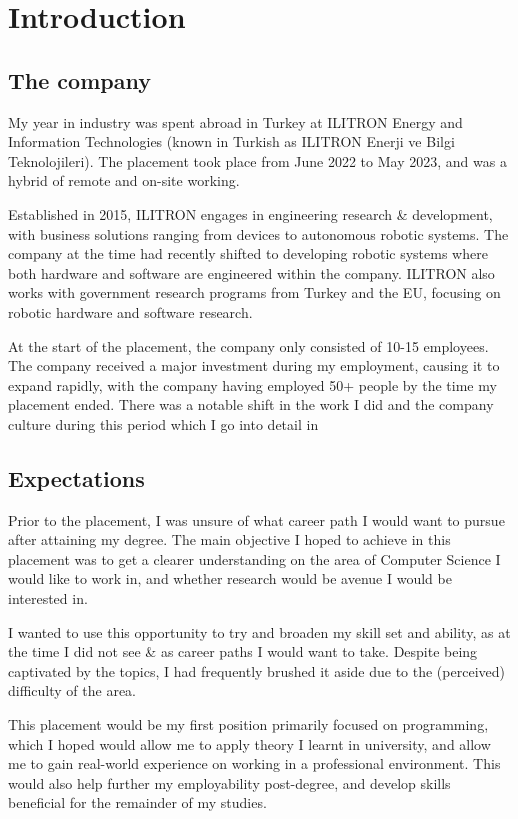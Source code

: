 \chapter{Introduction}

\section{The company}

My year in industry was spent abroad in Turkey at ILITRON Energy and Information Technologies (known
in Turkish as ILITRON Enerji ve Bilgi Teknolojileri). The placement took place from June 2022 to May
2023, and was a hybrid of remote and on-site working.

Established in 2015, ILITRON engages in engineering research \& development, with business solutions
ranging from  devices to autonomous robotic systems. The company at the time had recently
shifted to developing robotic systems where both hardware and software are engineered within the
company. ILITRON also works with government research programs from Turkey and the EU, focusing on
robotic hardware and software research.

At the start of the placement, the company only consisted of 10-15 employees. The company received a
major investment during my employment, causing it to expand rapidly, with the company having
employed 50+ people by the time my placement ended. There was a notable shift in the work I did and
the company culture during this period which I go into detail in

\section{Expectations}

Prior to the placement, I was unsure of what career path I would want to pursue after attaining my
degree. The main objective I hoped to achieve in this placement was to get a clearer understanding
on the area of Computer Science I would like to work in, and whether research would be avenue I
would be interested in.

I wanted to use this opportunity to try and broaden my skill set and ability, as at the time I did
not see  \&  as career paths I would want to take. Despite being captivated by the
topics, I had frequently brushed it aside due to the (perceived) difficulty of the area.

This placement would be my first position primarily focused on programming, which I hoped would
allow me to apply theory I learnt in university, and allow me to gain real-world experience on
working in a professional environment. This would also help further my employability post-degree,
and develop skills beneficial for the remainder of my studies.

